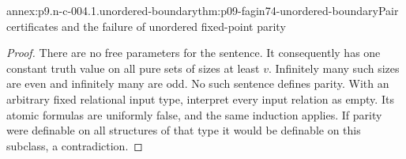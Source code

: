 \begin{annexitem}{annex:p9.n-c-004.1.unordered-boundary}{thm:p09-fagin74-unordered-boundary}{Pair certificates and the failure of unordered fixed-point parity}
\begin{proof}
There are no free parameters for the sentence.  It consequently has one
constant truth value on all pure sets of sizes at least \(v\).  Infinitely
many such sizes are even and infinitely many are odd.  No such sentence
defines parity.  With an arbitrary fixed relational input type, interpret
every input relation as empty.  Its atomic formulas are uniformly false,
and the same induction applies.  If parity were definable on all structures
of that type it would be definable on this subclass, a contradiction.
\end{proof}
\end{annexitem}
